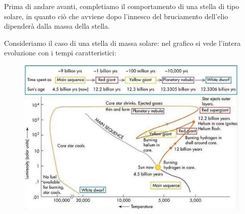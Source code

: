 Prima di andare avanti, completiamo il comportamento di una stella di tipo solare, in quanto ciò che avviene dopo l'innesco del bruciamento dell'elio dipenderà dalla massa della stella.

Consideriamo il caso di una stella di massa solare: nel grafico si vede l'intera evoluzione con i tempi caratteristici:

\begin{figure}[H]
    \centering
    \includegraphics[width=15cm]{Evoluzione del sole.png}
    \label{fig:Evoluzione del sole.png}
\end{figure}

